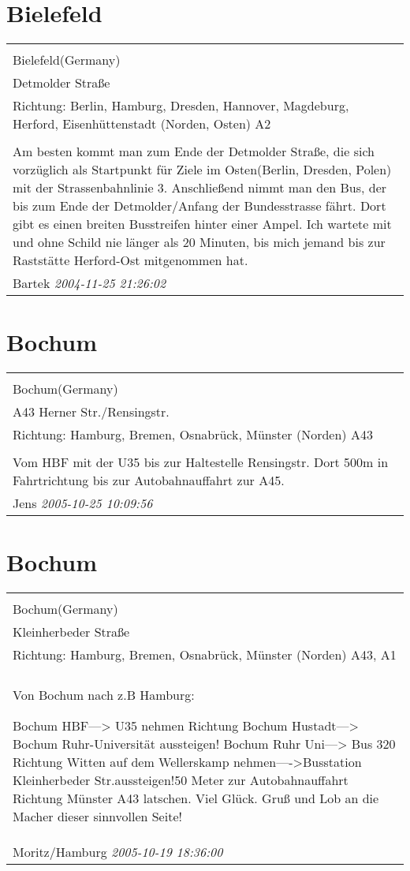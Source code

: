 \documentclass[a4paper,12pt]{article}
\begin{document}
\section{Bielefeld}
\begin{tabular}{|p{13cm}|}
\hline\\
Bielefeld(Germany)\\
Detmolder Straße\\
Richtung: Berlin, Hamburg, Dresden, Hannover, Magdeburg, Herford, Eisenhüttenstadt (Norden, Osten) A2 \\
\hline\\
Am besten kommt man zum Ende der Detmolder Straße, die sich vorzüglich als Startpunkt für Ziele im Osten(Berlin, Dresden, Polen) mit der Strassenbahnlinie 3. Anschließend nimmt man den Bus, der bis zum Ende der Detmolder/Anfang der Bundesstrasse fährt. Dort gibt es einen breiten Busstreifen hinter einer Ampel. Ich wartete mit und ohne Schild nie länger als 20 Minuten, bis mich jemand bis zur Raststätte Herford-Ost mitgenommen hat. \\
Bartek \textit{ 2004-11-25 21:26:02 }\\\hline
\end{tabular}


\section{Bochum}
\begin{tabular}{|p{13cm}|}
\hline\\
Bochum(Germany)\\
A43 Herner Str./Rensingstr.\\
Richtung: Hamburg, Bremen, Osnabrück, Münster (Norden) A43 \\
\hline\\
Vom HBF mit der U35 bis zur Haltestelle Rensingstr. Dort 500m in Fahrtrichtung bis zur Autobahnauffahrt zur A45. \\
Jens \textit{ 2005-10-25 10:09:56 }\\\hline
\end{tabular}


\section{Bochum}
\begin{tabular}{|p{13cm}|}
\hline\\
Bochum(Germany)\\
Kleinherbeder Straße\\
Richtung: Hamburg, Bremen, Osnabrück, Münster (Norden) A43, A1 \\
\hline\\
Von Bochum nach z.B Hamburg:

Bochum HBF---> U35 nehmen Richtung Bochum Hustadt---> Bochum Ruhr-Universität aussteigen!
Bochum Ruhr Uni---> Bus 320 Richtung Witten auf dem Wellerskamp nehmen---->Busstation Kleinherbeder Str.aussteigen!50 Meter zur Autobahnauffahrt Richtung Münster A43 latschen. Viel Glück.
Gruß und Lob an die Macher dieser sinnvollen Seite! \\
Moritz/Hamburg \textit{ 2005-10-19 18:36:00 }\\\hline
\end{tabular}
\end{document}
